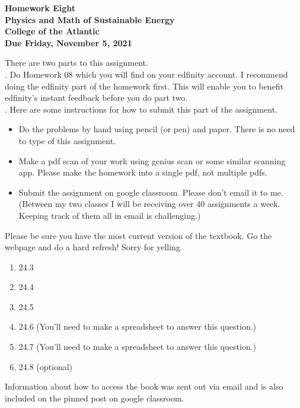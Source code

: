 \documentclass[12pt]{article}
\begin{document}
\pagestyle{empty}
 
\begin{center}
{\LARGE {\bf Homework Eight}}\\
\bigskip
{\Large {\bf Physics and Math of Sustainable Energy}}\\
\bigskip
{\Large {\bf College of the Atlantic}}\\
\bigskip
{ {\bf Due Friday, November 5, 2021}}\\ 
\end{center}
\medskip


\noindent There are two parts to this assignment.\\

.  Do Homework 08 which you will find
on your edfinity account.  I recommend doing the edfinity part of the
homework first.  This will enable you to benefit edfinity's instant
feedback before you do part two.\\


.  Here are some
instructions for how to submit this part of the assignment.
\begin{itemize}
\item Do the problems by hand using pencil (or pen) and paper.
  There is no need to type of this assignment.
\item Make a pdf scan of your work using genius scan or some
  similar scanning app.  Please make the homework into a single
  pdf, not multiple pdfs.
\item Submit the assignment on google classroom.  Please don't
  email it to me.  (Between my two classes I will be receiving
  over 40 assignments a week.  Keeping track of them all in email
  is challenging.)\\
\end{itemize}


  Please be sure you have the most
current version of the textbook.  Go the webpage and do a hard
refresh!  Sorry for yelling.\\ 

\begin{enumerate}
\setlength{\itemsep}{-1mm}
\item 24.3
\item 24.4
\item 24.5
\item 24.6 (You'll need to make a spreadsheet to answer this question.)
\item 24.7 (You'll need to make a spreadsheet to answer this question.)
\item 24.8 (optional)\\
\end{enumerate}


\noindent Information about how to access the book was sent out
via email and is also included on the pinned post on google
classroom. 
\end{document}
